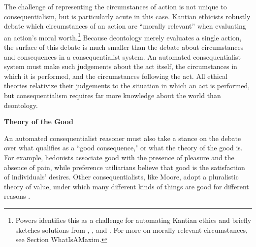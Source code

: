 \begin{isabellebody}
\begin{isamarkuptext}
The challenge of representing the circumstances of action is not unique to consequentialism, but is particularly acute in this case. Kantian ethicists robustly debate which circumstances of an action are ``morally relevant'' when evaluating an action's moral worth.\footnote{Powers 
\citet{powers} identifies this as a challenge for automating Kantian ethics and briefly sketches 
solutions from \citet{constofreason}, \citet{silber}, and \citet{rawlsconstructivism}. For more on 
morally relevant circumstances, see Section WhatIsAMaxim.} Because deontology merely evaluates a 
single action, the surface of this debate is much smaller than the debate about circumstances and 
consequences in a consequentialist system. An automated consequentialist system must make such 
judgements about the act itself, the circumstances in which it is performed, and the circumstances 
following the act. All ethical theories relativize their judgements to the situation in which an act 
is performed, but consequentialism requires far more knowledge about the world than deontology.%
\end{isamarkuptext}\isamarkuptrue%
%
\begin{isamarkuptext}%
\noindent \textbf{Theory of the Good}%
\end{isamarkuptext}\isamarkuptrue%
%
\begin{isamarkuptext}%
An automated consequentialist reasoner must also take a stance on the debate over
what qualifies as a ``good consequence," or what the theory of the good is. For example, hedonists associate
good with the presence of pleasure and the absence of pain, while preference utiliarians believe that good is 
the satisfaction of individuals' desires. Other consequentialists, like Moore, adopt a pluralistic theory of value, under which 
many different kinds of things are good for different reasons \citep{moorepe}. 


\end{isamarkuptext}
\end{isabellebody}
